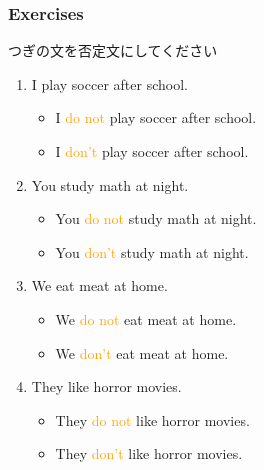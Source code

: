 \documentclass[aspectratio=169,xcolor={dvipsnames,table}]{beamer}
\newcommand{\myaudio}[1]{\href{#1}{\faVolumeUp}}
\begin{document}
\begin{frame}[plain]\frametitle{Exercises}
 
つぎの文を否定文にしてください
\begin{enumerate}
 \item I play soccer after school.\pause{}\hspace{63pt}{\footnotesize after school: 放課後に}\pause
         \begin{itemize}
	 \item I \textcolor{orange}{do not} play soccer after school.\\\pause
	  \item I \textcolor{orange}{don't} play soccer after school.\pause
	\end{itemize}
 \item You study math at night.\pause\hspace{68pt}{\footnotesize study: 勉強する　math: 数学　at night: 夜に}\\\pause
       \begin{itemize}
	\item You \textcolor{orange}{do not} study math at night.\\\pause
	\item You \textcolor{orange}{don't} study math at night.\pause
       \end{itemize}
 \item We eat meat at home.\pause\hspace{80pt}{\footnotesize eat: 食べる　meat: 肉　at home: 家で}\\\pause
\begin{itemize}
 \item We \textcolor{orange}{do not} eat meat at home.\\\pause
 \item We \textcolor{orange}{don't} eat meat at home.\pause
\end{itemize}
 \item They like horror movies.\pause\hspace{70pt}{\footnotesize horror movie: ホラー映画}\\\pause
\begin{itemize}
 \item They \textcolor{orange}{do not} like horror movies.\\\pause
 \item They \textcolor{orange}{don't} like horror movies.
\end{itemize}
\end{enumerate}

\myaudio{audio/007_negative_do_01.mp3}

\end{frame}
\end{document}
